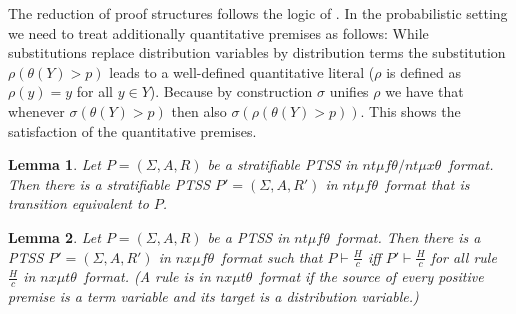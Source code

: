 \documentclass[submission,copyright,creativecommons]{eptcs}
\newtheorem{lemma}{Lemma}
\newcommand{\dedrule}[2]{\frac{#1}{#2}}
\newcommand{\ntmuft}{\ensuremath{\textit{nt}\mu\textit{f}\theta}}
\newcommand{\ntmuxt}{\ensuremath{\textit{nt}\mu\textit{x}\theta}}
\newcommand{\ntmufxt}{\ensuremath{\ntmuft\textit{/}\ntmuxt}}
\newcommand{\nxmuft}{\ensuremath{\textit{nx}\mu\textit{f}\theta}}
\newcommand{\nxmutt}{\ensuremath{\textit{nx}\mu\textit{t}\theta}}
\newcommand{\proves}{\vdash}
\begin{document}
The reduction of proof structures follows the logic of \cite{FokkinkvanGlabbeek96}. In the probabilistic setting we need to treat additionally quantitative premises as follows: While substitutions replace distribution variables by distribution terms the substitution $\rho(\theta(Y) > p)$ leads to a well-defined quantitative literal ($\rho$ is defined as $\rho(y) = y $ for all $y \in Y$). Because by construction $\sigma$ unifies $\rho$ we have that whenever $\sigma(\theta(Y) > p)$ then also $\sigma(\rho(\theta(Y) > p))$. This shows the satisfaction of the quantitative premises.

\begin{lemma}\label{lemma:ntmuft}
  Let $P = (\Sigma,A, R)$ be a stratifiable PTSS in \ntmufxt\ format.
  Then there is a stratifiable PTSS $P' = (\Sigma, A, R')$ in
  \ntmuft\ format that is transition equivalent to $P$.
\end{lemma}

\begin{lemma}\label{lemma:nxmuft}
  Let $P = (\Sigma,A, R)$ be a PTSS in \ntmuft\ format.
  Then there is a PTSS $P' = (\Sigma, A, R')$ in
  \nxmuft\ format such that 
  $P \proves \dedrule{H}{c}$ iff $P' \proves \dedrule{H}{c}$
  for all rule $\dedrule{H}{c}$ in \nxmutt\ format.
(A rule is in \nxmutt\ format if the source of every positive
  premise is a term variable and its target is a distribution
  variable.)
\end{lemma}
\end{document}
